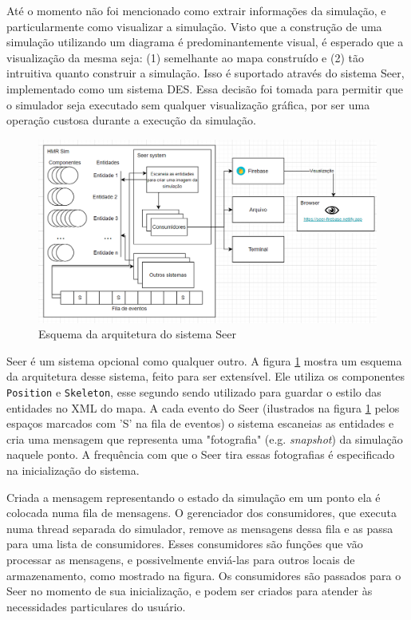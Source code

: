 Até o momento não foi mencionado como extrair informações da simulação, e particularmente como visualizar a simulação. Visto que a construção de uma simulação utilizando um diagrama é predominantemente visual, é esperado que a visualização da mesma seja: (1) semelhante ao mapa construído e (2) tão intruitiva quanto construir a simulação. Isso é suportado através do sistema Seer, implementado como um sistema DES. Essa decisão foi tomada para permitir que o simulador seja executado sem qualquer visualização gráfica, por ser uma operação custosa durante a execução da simulação.

\begin{figure}[ht]
    \centering
    \includegraphics[width=\textwidth]{img/seer_architecture.png}
    \caption{Esquema da arquitetura do sistema Seer}
    \label{fig:seer_architecture}
\end{figure}

Seer é um sistema opcional como qualquer outro. A figura \ref{fig:seer_architecture} mostra um esquema da arquitetura desse sistema, feito para ser extensível. Ele utiliza os componentes \texttt{Position} e \texttt{Skeleton}, esse segundo sendo utilizado para guardar o estilo das entidades no XML do mapa. A cada evento do Seer (ilustrados na figura \ref{fig:seer_architecture} pelos espaços marcados com 'S' na fila de eventos) o sistema escaneias as entidades e cria uma mensagem que representa uma "fotografia" (e.g. \textit{snapshot}) da simulação naquele ponto. A frequência com que o Seer tira essas fotografias é especificado na inicialização do sistema. 

Criada a mensagem representando o estado da simulação em um ponto ela é colocada numa fila de mensagens. O gerenciador dos consumidores, que executa numa thread separada do simulador, remove as mensagens dessa fila e as passa para uma lista de consumidores. Esses consumidores são funções que vão processar as mensagens, e possivelmente enviá-las para outros locais de armazenamento, como mostrado na figura. Os consumidores são passados para o Seer no momento de sua inicialização, e podem ser criados para atender às necessidades particulares do usuário. 


